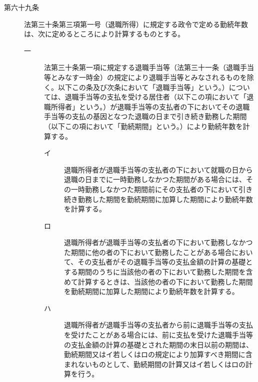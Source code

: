 \documentclass[twocolumn,a4j,10pt]{ltjtarticle}
\begin{document}
\begin{description}
\item[第六十九条]法第三十条第三項第一号（退職所得）に規定する政令で定める勤続年数は、次に定めるところにより計算するものとする。
\begin{description}
\item[一]法第三十条第一項に規定する退職手当等（法第三十一条（退職手当等とみなす一時金）の規定により退職手当等とみなされるものを除く。以下この条及び次条において「退職手当等」という。）については、退職手当等の支払を受ける居住者（以下この項において「退職所得者」という。）が退職手当等の支払者の下においてその退職手当等の支払の基因となつた退職の日まで引き続き勤務した期間（以下この項において「勤続期間」という。）により勤続年数を計算する。
\begin{description}
\item[イ]退職所得者が退職手当等の支払者の下において就職の日から退職の日までに一時勤務しなかつた期間がある場合には、その一時勤務しなかつた期間前にその支払者の下において引き続き勤務した期間を勤続期間に加算した期間により勤続年数を計算する。
\item[ロ]退職所得者が退職手当等の支払者の下において勤務しなかつた期間に他の者の下において勤務したことがある場合において、その支払者がその退職手当等の支払金額の計算の基礎とする期間のうちに当該他の者の下において勤務した期間を含めて計算するときは、当該他の者の下において勤務した期間を勤続期間に加算した期間により勤続年数を計算する。
\item[ハ]退職所得者が退職手当等の支払者から前に退職手当等の支払を受けたことがある場合には、前に支払を受けた退職手当等の支払金額の計算の基礎とされた期間の末日以前の期間は、勤続期間又はイ若しくはロの規定により加算すべき期間に含まれないものとして、勤続期間の計算又はイ若しくはロの計算を行う。
\end{description}

\end{description}
\end{description}
\end{document}
